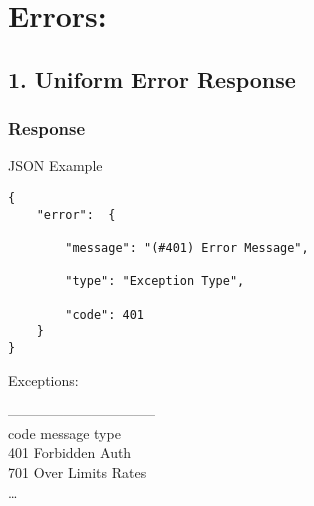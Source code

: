 \part{Errors:}
\label{errors:}

\chapter{1. Uniform Error Response}
\label{uniformerrorresponse}

\section{Response}
\label{response}

JSON Example

\begin{verbatim}
{
    "error":  {

        "message": "(#401) Error Message",

        "type": "Exception Type",

        "code": 401
    }
}
\end{verbatim}


Exceptions:

\textbar{} --------------------------------\textbar{}\\
\textbar{} code \textbar{} message \textbar{} type \textbar{}\\
\textbar{} 401 \textbar{} Forbidden \textbar{} Auth \textbar{}\\
\textbar{} 701 \textbar{} Over Limits\textbar{} Rates \textbar{}\\
{\ldots}
